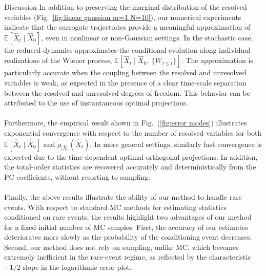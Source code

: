 \documentclass[11pt, a4paper, oneside, reqno]{amsart}
\makeatletter
\def\subsection{\@startsection{subsection}{2}%
	\z@{.5\linespacing\@plus.7\linespacing}{.5\linespacing}%
	{\normalfont\large\bfseries}}
\makeatother
\begin{document}
\subsection{Discussion}
\noindent In addition to preserving the marginal distribution of the resolved variables (Fig.~\ref{fig:linear gaussian m=1 N=10}), our numerical experiments indicate that the surrogate trajectories provide a meaningful approximation of $\mathbb{E}[\hat{X}_t\mid\hat{X}_0]$, even in nonlinear or non-Gaussian settings.
In the stochastic case, the reduced dynamics approximates the conditional evolution along individual realizations of the Wiener process, $\mathbb{E}[\hat{X}_t\mid\hat{X}_0, \ \{W_{\tau\leq t}\}]$.
The approximation is particularly accurate when the coupling between the resolved and unresolved variables is weak, as expected in the presence of a clear time-scale separation between the resolved and unresolved degrees of freedom. This behavior can be attributed to the use of instantaneous optimal projections.\\ \ \\
Furthermore, the empirical result shown in Fig.~(\ref{fig:error modes}) illustrates exponential convergence  with respect to the number of resolved variables for both $\mathbb{E}[\hat{X}_t\mid\hat{X}_0]$ and $\rho_{|\hat{X}_0}(\hat{X}_t)$. In more general settings, similarly fast convergence is expected due to the time-dependent optimal orthogonal projections. In addition, the total-order statistics are recovered accurately and deterministically from the PC coefficients, without resorting to sampling. \\ \ \\
Finally, the above results illustrate the ability of our method to handle rare events. With respect to standard MC methods for estimating statistics conditioned on rare events, the results highlight two advantages of our method for a fixed initial number of MC samples.%
First, the accuracy of our estimates deteriorates more slowly as the probability of the conditioning event decreases. Second, our method does not rely on sampling, unlike MC, which becomes extremely inefficient in the rare-event regime, as reflected by the characteristic $-1/2$ slope in the logarithmic error plot. %
\end{document}
